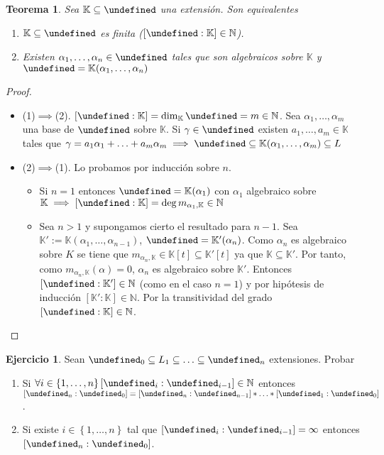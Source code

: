 \documentclass[10pt, spanish]{report}
\newtheorem*{tma}{Teorema}
\theoremstyle{definition}
\newtheorem*{ejer}{Ejercicio}
\newcommand{\N}{\mathbb{N}}
\newcommand{\K}{\mathbb{K}}
\let\L\undefined
\newcommand{\L}{\mathbb{L}}
\begin{document}
\begin{tma}
    Sea $\K\subseteq\L$ una extensión. Son equivalentes
    \begin{enumerate}
        \item $\K\subseteq\L$ es finita ($[\L:\K]\in \N$).
        \item Existen $\alpha_1,\ldots,\alpha_n\in\L$ tales que son algebraicos
            sobre $\K$ y $\L=\K(\alpha_1,\ldots,\alpha_n)$
    \end{enumerate}
\end{tma}

\begin{proof}\hspace{0pt}
    \begin{itemize}
        \item (1)$\implies$(2). $[\L:\K]=\dim_\K{\L}=m\in\N$. Sea
            $\alpha_1,\ldots,\alpha_m$ una base de $\L$ sobre $\K$. Si
            $\gamma\in\L$ existen $a_1,\ldots,a_m\in \K$ tales que
            $\gamma=a_1\alpha_1+\ldots+a_m\alpha_m \implies \L\subseteq
            \K(\alpha_1,\ldots,\alpha_m)\subseteq L$
        \item (2)$\implies$(1). Lo probamos por inducción sobre $n$.
            \begin{itemize}
                \item Si $n=1$ entonces $\L=\K(\alpha_1)$ con $\alpha_1$
                    algebraico sobre $\K \implies
                    [\L:\K]=\deg{m_{\alpha_1,\K}}\in\N$
                \item Sea $n>1$ y supongamos cierto el resultado para $n-1$. Sea
                    $\K':=\K(\alpha_1,\ldots,\alpha_{n-1})$, $\L=\K'(\alpha_n)$.
                    Como $\alpha_n$ es algebraico sobre $K$ se tiene que
                    $m_{\alpha_n,\K}\in \K[t]\subseteq\K'[t]$ ya que
                    $\K\subseteq\K'$. Por tanto, como $m_{\alpha_n,\K}(\alpha)=
                    0$, $\alpha_n$ es algebraico sobre $\K'$. Entonces $[\L:\K']
                    \in\N$ (como en el caso $n=1$) y por hipótesis de inducción
                    $[\K':\K]\in \N$. Por la transitividad del grado
                    $[\L:\K]\in\N$.
            \end{itemize}
    \end{itemize}
\end{proof}

\begin{ejer}
    Sean $\L_0\subseteq L_1\subseteq\ldots\subseteq\L_n$ extensiones. Probar
    \begin{enumerate}
        \item Si $\forall i\in \left\{ 1,\ldots,n\right\}[\L_i:\L_{i-1}]\in\N$
            entonces $ [\L_n:\L_0]=[\L_n:\L_{n-1}]*\ldots*[\L_1:\L_0]$.
        \item Si existe $i\in \left\{ 1,\ldots,n\right\}$ tal que
            $[\L_i:\L_{i-1}]=\infty$ entonces $[\L_n:\L_0]$.
    \end{enumerate}
\end{ejer}
\end{document}
